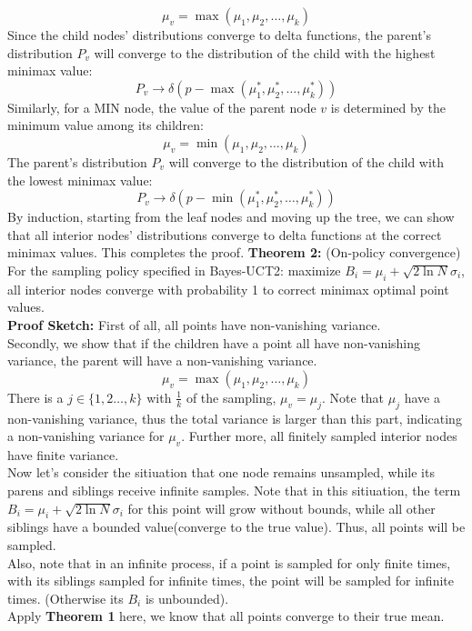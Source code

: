 \documentclass[11pt]{article}
\theoremstyle{definitionstyle}
\begin{document}
\[
\mu_v = \max(\mu_1, \mu_2, \ldots, \mu_k)
\]
Since the child nodes' distributions converge to delta functions, the parent's distribution \(P_v\) will converge to the distribution of the child with the highest minimax value:
\[
P_v \to \delta(p - \max(\mu_1^*, \mu_2^*, \ldots, \mu_k^*))
\]
Similarly, for a MIN node, the value of the parent node \(v\) is determined by the minimum value among its children:
\[
\mu_v = \min(\mu_1, \mu_2, \ldots, \mu_k)
\]
The parent's distribution \(P_v\) will converge to the distribution of the child with the lowest minimax value:
\[
P_v \to \delta(p - \min(\mu_1^*, \mu_2^*, \ldots, \mu_k^*))
\]
By induction, starting from the leaf nodes and moving up the tree, we can show that all interior nodes' distributions converge to delta functions at the correct minimax values. This completes the proof.
\textbf{Theorem 2:} (On-policy convergence) For the sampling policy specified in Bayes-UCT2: maximize \(B_i = \mu_i + \sqrt{2 \ln N} \sigma_i\), all interior nodes converge with probability 1 to correct minimax optimal point values.\\
\textbf{Proof Sketch:} First of all, all points have non-vanishing variance.\\
Secondly, we show that if the children have a point all have non-vanishing variance, the parent will have a non-vanishing variance.\\
\[
    \mu_v=\max(\mu_1,\mu_2,\ldots,\mu_k)
\]
There is a $j\in\{1,2\ldots,k\}$ with $\frac{1}{k}$ of the sampling, $\mu_v=\mu_j$. Note that $\mu_j$ have a non-vanishing variance, thus the total variance is larger than this part, indicating a non-vanishing variance for $\mu_v$. Further more, all ﬁnitely sampled interior nodes have
ﬁnite variance.\\
Now let's consider the sitiuation that one node remains unsampled, while its parens and siblings receive infinite samples. Note that in this sitiuation, the term \(B_i = \mu_i + \sqrt{2 \ln N} \sigma_i\) for this point will grow without bounds, while all other siblings have a bounded value(converge to the true value). Thus, all points will be sampled.\\
Also, note that in an infinite process, if a point is sampled for only finite times, with its siblings sampled for infinite times, the point will be sampled for infinite times. (Otherwise its $B_i$ is unbounded).\\
Apply \textbf{Theorem 1} here, we know that all points converge to their true mean.\\
\end{document}
